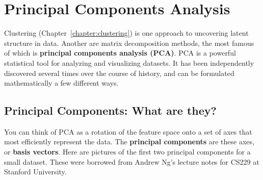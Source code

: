 \chapter{Principal Components Analysis \label{chapter:pca}}

Clustering (Chapter~\ref{chapter:clustering}) is one approach to uncovering latent structure in data. Another are matrix decomposition methods, the most famous of which is \textbf{principal components analysis (PCA)}. PCA is a powerful statistical tool for analyzing and visualizing datasets. It has been independently discovered several times over the course of history, and can be formulated mathematically a few different ways.


\section{Principal Components: What are they?}

You can think of PCA as a rotation of the feature space onto a set of axes that most efficiently represent the data. The \textbf{principal components} are these axes, or \textbf{basis vectors}. Here are pictures of the first two principal components for a small dataset. These were borrowed from Andrew Ng's lecture notes for CS229 at Stanford University. 

